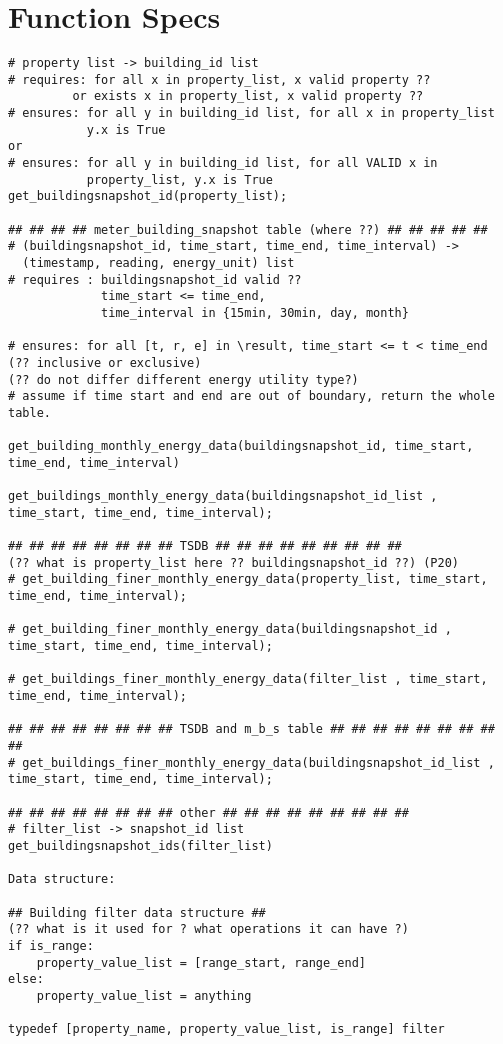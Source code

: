 \documentclass[hidelinks,12pt]{article}
\begin{document}
\section{Function Specs}
\begin{verbatim}
# property list -> building_id list
# requires: for all x in property_list, x valid property ??
         or exists x in property_list, x valid property ??
# ensures: for all y in building_id list, for all x in property_list
           y.x is True
or 
# ensures: for all y in building_id list, for all VALID x in 
           property_list, y.x is True
get_buildingsnapshot_id(property_list);

## ## ## ## meter_building_snapshot table (where ??) ## ## ## ## ##
# (buildingsnapshot_id, time_start, time_end, time_interval) -> 
  (timestamp, reading, energy_unit) list
# requires : buildingsnapshot_id valid ??
             time_start <= time_end,
             time_interval in {15min, 30min, day, month}
             
# ensures: for all [t, r, e] in \result, time_start <= t < time_end
(?? inclusive or exclusive)
(?? do not differ different energy utility type?)
# assume if time start and end are out of boundary, return the whole
table.

get_building_monthly_energy_data(buildingsnapshot_id, time_start,
time_end, time_interval)

get_buildings_monthly_energy_data(buildingsnapshot_id_list ,
time_start, time_end, time_interval);

## ## ## ## ## ## ## ## TSDB ## ## ## ## ## ## ## ## ##
(?? what is property_list here ?? buildingsnapshot_id ??) (P20)
# get_building_finer_monthly_energy_data(property_list, time_start,
time_end, time_interval);

# get_building_finer_monthly_energy_data(buildingsnapshot_id ,
time_start, time_end, time_interval);

# get_buildings_finer_monthly_energy_data(filter_list , time_start,
time_end, time_interval);

## ## ## ## ## ## ## ## TSDB and m_b_s table ## ## ## ## ## ## ## ## ##
# get_buildings_finer_monthly_energy_data(buildingsnapshot_id_list ,
time_start, time_end, time_interval);

## ## ## ## ## ## ## ## other ## ## ## ## ## ## ## ## ##
# filter_list -> snapshot_id list
get_buildingsnapshot_ids(filter_list)

Data structure:

## Building filter data structure ##
(?? what is it used for ? what operations it can have ?)
if is_range: 
    property_value_list = [range_start, range_end]
else:
    property_value_list = anything
    
typedef [property_name, property_value_list, is_range] filter
\end{verbatim}
\end{document}
